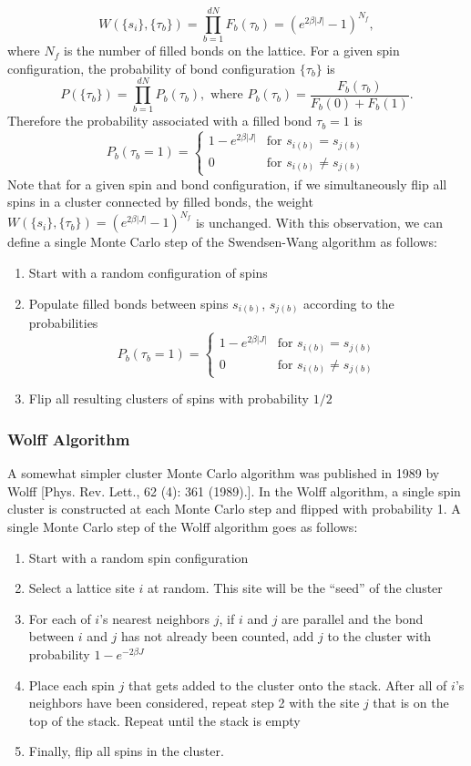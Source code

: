 \documentclass[11pt, oneside]{article}
\begin{document}
$$W(\{s_i\}, \{\tau_b\})=\prod_{b=1}^{dN}F_b(\tau_b)=(e^{2\beta|J|}-1)^{N_f},$$
where $N_f$ is the number of filled bonds on the lattice. For a given spin configuration, the probability of bond configuration $\{\tau_b\}$ is
$$P(\{\tau_b\})=\prod_{b=1}^{dN}P_b(\tau_b),\text{ where }P_b(\tau_b)=\frac{F_b(\tau_b)}{F_b(0)+F_b(1)}.$$
Therefore the probability associated with a filled bond $\tau_b=1$ is
$$P_b(\tau_b=1)=\begin{cases}
	1-e^{2\beta|J|}&\text{for $s_{i(b)}=s_{j(b)}$}\\
	0&\text{for $s_{i(b)}\neq s_{j(b)}$}
\end{cases}$$
Note that for a given spin and bond configuration, if we simultaneously flip all spins in a cluster connected by filled bonds, the weight $W(\{s_i\}, \{\tau_b\})=(e^{2\beta|J|}-1)^{N_f}$ is unchanged. With this observation, we can define a single Monte Carlo step of the Swendsen-Wang algorithm as follows:
\begin{enumerate}
	\item{Start with a random configuration of spins}
	\item{Populate filled bonds between spins $s_{i(b)}$, $s_{j(b)}$ according to the probabilities
	$$P_b(\tau_b=1)=\begin{cases}
	1-e^{2\beta|J|}&\text{for $s_{i(b)}=s_{j(b)}$}\\
	0&\text{for $s_{i(b)}\neq s_{j(b)}$}
\end{cases}$$}
	\item{Flip all resulting clusters of spins with probability $1/2$}
\end{enumerate}
\subsubsection{Wolff Algorithm}
A somewhat simpler cluster Monte Carlo algorithm was published in 1989 by Wolff [Phys. Rev. Lett., 62 (4): 361 (1989).]. In the Wolff algorithm, a single spin cluster is constructed at each Monte Carlo step and flipped with probability 1. A single Monte Carlo step of the Wolff algorithm goes as follows:
\begin{enumerate}
	\item{Start with a random spin configuration}
	\item{Select a lattice site $i$ at random. This site will be the ``seed'' of the cluster}
	\item{For each of $i$'s nearest neighbors $j$, if $i$ and $j$ are parallel and the bond between $i$ and $j$ has not already been counted, add $j$ to the cluster with probability $1-e^{-2\beta J}$ }
	\item{Place each spin $j$ that gets added to the cluster onto the stack. After all of $i$'s neighbors have been considered, repeat step 2 with the site $j$ that is on the top of the stack. Repeat until the stack is empty}
	\item{Finally, flip all spins in the cluster.}
\end{enumerate}
%
%
\end{document}
